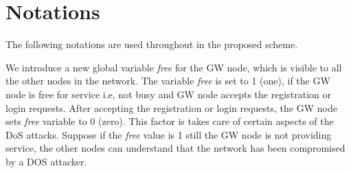 \documentclass[a4paper,12pt]{report}
\begin{document}
\section{Notations}
The following notations are used throughout in the proposed scheme.

\begin{table}[h]
\caption{Different notations and their meanings}
\centering
{}
\label{F6}
\end{table}

We introduce a new global variable \textit{free} for the GW node,
which is visible to all the other nodes in the network. The variable
\emph{free} is set to 1 (one), if the GW node is free for service
i.e, not busy and GW node accepts the registration or login
requests. After accepting the registration or login requests, the GW
node sets \emph{free} variable to 0 (zero). This factor is takes
care of certain aspects of the DoS attacks. Suppose if the
\textit{free} value is 1 still the GW node is not providing service,
the other nodes can understand that the network has been compromised
by a DOS attacker.
\end{document}
